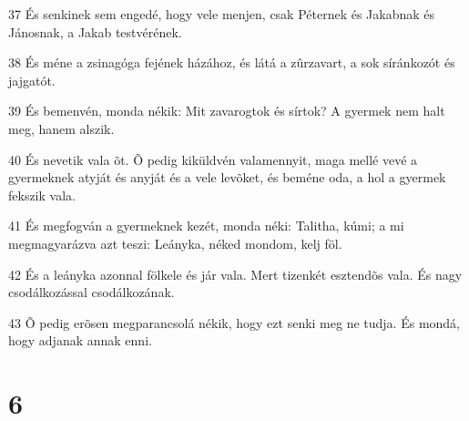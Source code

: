\par 37 És senkinek sem engedé, hogy vele menjen, csak Péternek és Jakabnak és Jánosnak, a Jakab testvérének.
\par 38 És méne a zsinagóga fejének házához, és látá a zûrzavart, a sok síránkozót és jajgatót.
\par 39 És bemenvén, monda nékik: Mit zavarogtok és sírtok? A gyermek nem halt meg, hanem alszik.
\par 40 És nevetik vala õt. Õ pedig kiküldvén valamennyit, maga mellé vevé a gyermeknek atyját és anyját és a vele levõket, és beméne oda, a hol a gyermek fekszik vala.
\par 41 És megfogván a gyermeknek kezét, monda néki: Talitha, kúmi; a mi megmagyarázva azt teszi: Leányka, néked mondom, kelj föl.
\par 42 És a leányka azonnal fölkele és jár vala. Mert tizenkét esztendõs vala. És nagy csodálkozással csodálkozának.
\par 43 Õ pedig erõsen megparancsolá nékik, hogy ezt senki meg ne tudja. És mondá, hogy adjanak annak enni.

\chapter{6}

